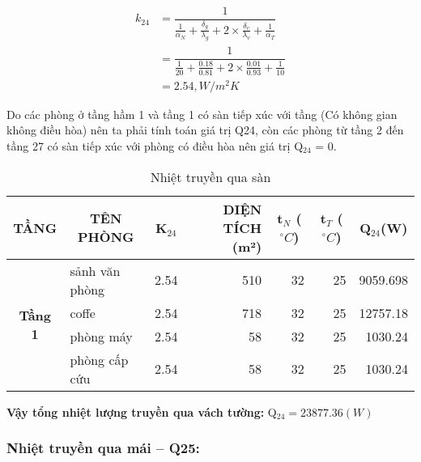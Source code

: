 {\Large \begin{equation*}
	\begin{split}
		k_{24} &= \dfrac{1}{\frac{1}{\alpha_{N}} + \frac{\delta_{g}}{\lambda_{g}} + 2\times\frac{\delta_{v}}{\lambda_{v}} + \frac{1}{\alpha_{T}}}\\
		&= \dfrac{1}{\frac{1}{20} + \frac{0.18}{0.81} + 2\times\frac{0.01}{0.93} + \frac{1}{10}}\\
		&={\scriptstyle 2.54, W/m^2 K}
	\end{split}
\end{equation*}}

Do các phòng ở tầng hầm 1 và tầng 1 có sàn tiếp xúc với tầng (Có không gian không điều hòa) nên ta phải tính toán giá trị Q24, còn các phòng từ tầng 2 đến tầng 27 có sàn tiếp xúc với phòng có điều hòa nên giá trị Q$ _{24} $ = 0.

\begin{table}[H]
	\centering
	\caption{Nhiệt truyền qua sàn}
	\begin{tabular}{|c|l|r|r|r|r|r|}
		\hline
		\textbf{ TẦNG} & \multicolumn{1}{c|}{\textbf{TÊN PHÒNG}} & \multicolumn{1}{c|}{\textbf{K$ _{24} $}} & \multicolumn{1}{p{6.145em}|}{\textbf{DIỆN TÍCH (m²) }} & \multicolumn{1}{c|}{\textbf{t$_{N}$ ($^{\circ}C$)}} & \multicolumn{1}{c|}{\textbf{t$_{T}$ ($^{\circ}C$)}} & \multicolumn{1}{c|}{\textbf{Q$ _{24} $(W)}} \bigstrut\\
		\hline
		\multirow{4}[8]{*}{\textbf{Tầng 1}} & sảnh văn phòng & 2.54  & 510   & 32    & 25    & 9059.698 \bigstrut\\
		\cline{2-7}          & coffe & 2.54  & 718   & 32    & 25    & 12757.18 \bigstrut\\
		\cline{2-7}          & phòng máy & 2.54  & 58    & 32    & 25    & 1030.24 \bigstrut\\
		\cline{2-7}          & phòng cấp cứu & 2.54  & 58    & 32    & 25    & 1030.24 \bigstrut\\
		\hline
	\end{tabular}%
	\label{tab:addlabel}%
\end{table}%
\textbf{Vậy tổng nhiệt lượng truyền qua vách tường:} Q$_{24} = 23877.36(W)$

\subsubsection{Nhiệt truyền qua mái -- Q{\scriptsize 25}:}

